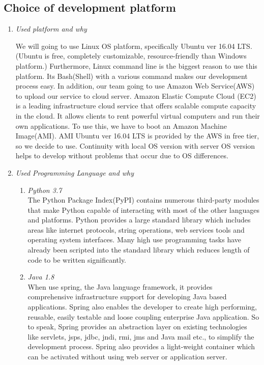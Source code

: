 \documentclass[conference]{IEEEtran}
\begin{document}
\subsection{Choice of development platform}
\begin{enumerate}
  \item 
  \textit{Used platform and why}
	
We will going to use Linux OS platform, specifically Ubuntu ver 16.04 LTS.  (Ubuntu is free, completely customizable, resource-friendly than Windows platform.) Furthermore, Linux command line is the biggest reason to use this platform. Its Bash(Shell) with a various command makes our development process easy.
In addition, our team going to use Amazon Web Service(AWS) to upload our service to cloud server. Amazon Elastic Compute Cloud (EC2) is a leading infrastructure cloud service that offers scalable compute capacity in the cloud. It allows clients to rent powerful virtual computers and run their own applications. To use this, we have to boot an Amazon Machine Image(AMI). AMI Ubuntu ver 16.04 LTS is provided by the AWS in free tier, so we decide to use. Continuity with local OS version with server OS version helps to develop without problems that occur due to OS differences.
\\
  
   \item \textit{Used Programming Language and why}
       \begin{enumerate}
    	\item \textit{Python 3.7}
\\The Python Package Index(PyPI) contains numerous third-party modules that make Python capable of interacting with most of the other languages and platforms. Python provides a large standard library which includes areas like internet protocols, string operations, web services tools and operating system interfaces. Many high use programming tasks have already been scripted into the standard library which reduces length of code to be written significantly.\\

        \item \textit{Java 1.8}
 \\When use spring, the Java language framework, it provides comprehensive infrastructure support for developing Java based applications. Spring also enables the developer to create high performing, reusable, easily testable and loose coupling enterprise Java application. So to speak, Spring provides an abstraction layer on existing technologies like servlets, jsps, jdbc, jndi, rmi, jms and Java mail etc., to simplify the development process. Spring also provides a light-weight container which can be activated without using web server or application server.\\
    

\end{enumerate}
\end{enumerate}
\end{document}
